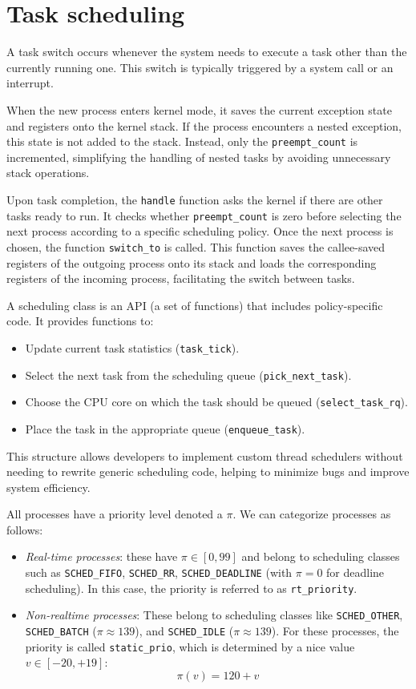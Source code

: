 \section{Task scheduling}

A task switch occurs whenever the system needs to execute a task other than the currently running one. 
This switch is typically triggered by a system call or an interrupt.

When the new process enters kernel mode, it saves the current exception state and registers onto the kernel stack. 
If the process encounters a nested exception, this state is not added to the stack. 
Instead, only the \texttt{preempt\_count} is incremented, simplifying the handling of nested tasks by avoiding unnecessary stack operations.

Upon task completion, the \texttt{handle} function asks the kernel if there are other tasks ready to run. 
It checks whether \texttt{preempt\_count} is zero before selecting the next process according to a specific scheduling policy. 
Once the next process is chosen, the function \texttt{switch\_to} is called. 
This function saves the callee-saved registers of the outgoing process onto its stack and loads the corresponding registers of the incoming process, facilitating the switch between tasks.

A scheduling class is an API (a set of functions) that includes policy-specific code. It provides functions to:
\begin{itemize}
    \item Update current task statistics (\texttt{task\_tick}).
    \item Select the next task from the scheduling queue (\texttt{pick\_next\_task}).
    \item Choose the CPU core on which the task should be queued (\texttt{select\_task\_rq}).
    \item Place the task in the appropriate queue (\texttt{enqueue\_task}).
\end{itemize}
This structure allows developers to implement custom thread schedulers without needing to rewrite generic scheduling code, helping to minimize bugs and improve system efficiency.

All processes have a priority level denoted a $\pi$.
We can categorize processes as follows:
\begin{itemize}
    \item \textit{Real-time processes}: these have $\pi\in[0, 99]$ and belong to scheduling classes such as \texttt{SCHED\_FIFO}, \texttt{SCHED\_RR}, \texttt{SCHED\_DEADLINE} (with $\pi=0$ for deadline scheduling). 
    In this case, the priority is referred to as \texttt{rt\_priority}.
    \item \textit{Non-realtime processes}: These belong to scheduling classes like \texttt{SCHED\_OTHER}, \texttt{SCHED\_BATCH} ($\pi \approx 139$), and \texttt{SCHED\_IDLE} ($\pi \approx 139$). 
        For these processes, the priority is called \texttt{static\_prio}, which is determined by a nice value $v \in [-20, +19]$:
        \[\pi(v)=120+v\]
\end{itemize}

